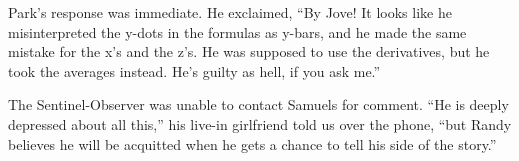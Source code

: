 Park's response was immediate. He exclaimed, ``By Jove! It looks like he
misinterpreted the y-dots in the formulas as y-bars, and he made the same
mistake for the x's and the z's. He was supposed to use the derivatives, but he
took the averages instead. He's guilty as hell, if you ask me.''

The Sentinel-Observer was unable to contact Samuels for comment. ``He is deeply
depressed about all this,'' his live-in girlfriend told us over the phone, ``but
Randy believes he will be acquitted when he gets a chance to tell his side of
the story.''
